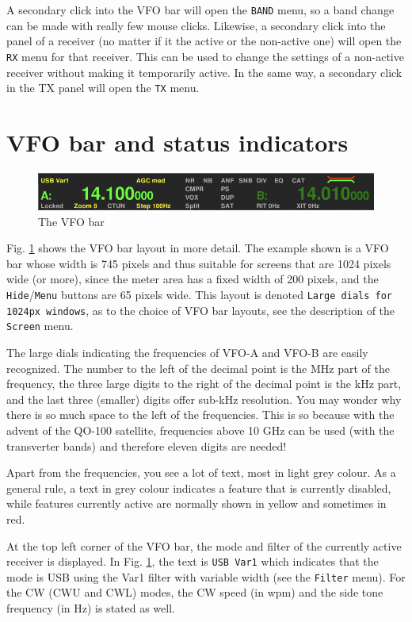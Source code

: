 \documentclass[12pt]{book}
\def\rett#1{\texttt{\color{red}#1}}
\def\bltt#1{\texttt{\color{blue}#1}}
\begin{document}
A secondary click into the VFO bar will open the \bltt{BAND} menu,
so a band change can be made with really few mouse clicks. Likewise,
a secondary click into the panel of a receiver (no matter if it
the active or the non-active one) will open the \bltt{RX} menu
for that receiver. This can be used to change the settings of a
non-active receiver without making it temporarily active. In the
same way, a secondary click in the TX panel will open the
\bltt{TX} menu.

\section{VFO bar and status  indicators}
\label{sec:VFObar}
\begin{figure}[h]
\center
\includegraphics[width=12cm]{VFObar.png}
\caption{The VFO bar}
\label{fig:VFObar}
\end{figure}

Fig. \ref{fig:VFObar} shows the VFO bar layout in more  detail.
The example shown is a VFO bar whose width is 745 pixels and
thus suitable for screens that are 1024 pixels wide (or more),
since the meter area has a fixed width of 200 pixels, and
the \rett{Hide}/\rett{Menu} buttons are 65 pixels wide. This layout is
denoted \texttt{Large dials for 1024px windows}, as to the choice
of VFO bar layouts, see the description of the \bltt{Screen} menu.

The large dials indicating the frequencies of VFO-A and VFO-B
are easily recognized. The number to the left of the decimal
point is the MHz part of the frequency, the three  large digits
to the right  of  the decimal point is the kHz part, and
the last three (smaller) digits offer sub-kHz resolution.
You may wonder why there is  so much space to the left of
the frequencies. This is so because with the advent of
the QO-100 satellite, frequencies above 10 GHz can be
used (with the transverter bands) and therefore eleven
digits are needed!

Apart from the frequencies, you see a lot  of text, most in
light grey colour. As a general rule, a text  in grey
colour indicates a feature that is currently disabled,
while features currently active are normally shown in
yellow and sometimes in red.

At the top left  corner of the VFO bar, the mode and
filter of the currently active receiver is displayed. 
In Fig. \ref{fig:VFObar}, the text is \rett{USB Var1}
which indicates that the  mode
is USB using the Var1 filter with variable width (see the \bltt{Filter} menu).
For the CW (CWU and CWL) modes, the CW speed (in wpm) and the side tone
frequency (in Hz) is stated as well.
\end{document}
